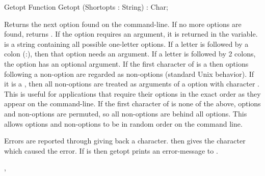 \begin{function}{Getopt}
\Declaration
Function Getopt (Shortopts : String) : Char;

\Description

Returns the next option found on the command-line. If no more options are
found, returns . If the option requires an argument, it is
returned in the  variable.
 is a string containing all possible one-letter options.
If a letter is followed by a colon (:), then that option needs an argument.
If a letter is followed by 2 colons, the option has an optional argument.
If the first character of  is a  then options following a non-option are
regarded as non-options (standard Unix behavior). If it is a ,
then all non-options are treated as arguments of a option with character
. This is useful for applications that require their options in
the exact order as they appear on the command-line.
If the first character of  is none of the above, options
and non-options are permuted, so all non-options are behind all options.
This allows options and non-options to be in random order on the command
line.

\Errors
 
Errors are reported through giving back a  character. 
then gives the character which caused the error. If  is
 then getopt prints an error-message to .

\SeeAlso
{}, 
\end{function}
\latex{}
\html{}

